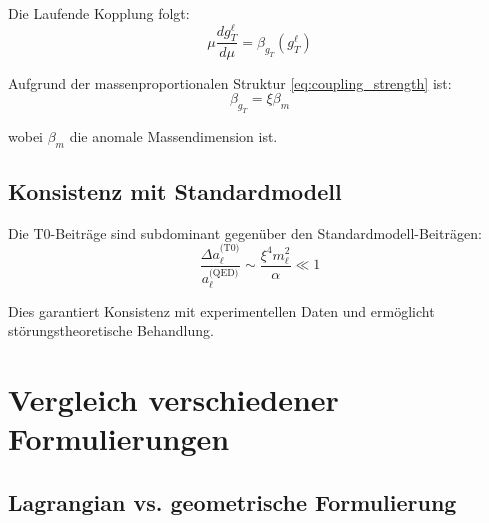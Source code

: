 	Die Laufende Kopplung folgt:
	\begin{equation}
		\mu \frac{d g_T^\ell}{d\mu} = \beta_{g_T}(g_T^\ell)
		\label{eq:rg_equation}
	\end{equation}
	
	Aufgrund der massenproportionalen Struktur \eqref{eq:coupling_strength} ist:
	\begin{equation}
		\beta_{g_T} = \xi \beta_m
		\label{eq:beta_relation}
	\end{equation}
	
	wobei $\beta_m$ die anomale Massendimension ist.
	
	\subsection{Konsistenz mit Standardmodell}
	
	Die T0-Beiträge sind subdominant gegenüber den Standardmodell-Beiträgen:
	\begin{equation}
		\frac{\Delta a_\ell^{\text{(T0)}}}{a_\ell^{\text{(QED)}}} \sim \frac{\xi^4 m_\ell^2}{\alpha} \ll 1
		\label{eq:hierarchy}
	\end{equation}
	
	Dies garantiert Konsistenz mit experimentellen Daten und ermöglicht störungstheoretische Behandlung.
	
	\section{Vergleich verschiedener Formulierungen}
	
	\subsection{Lagrangian vs. geometrische Formulierung}
	
	\begin{table}[h]
		\centering
		\caption{Vergleich der Formulierungen}
		\label{tab:comparison}
	\end{table}
	
